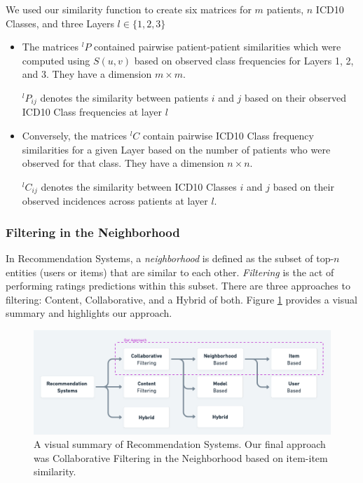 \documentclass[twoside,11pt]{article}
\begin{document}
We used our similarity function to create six matrices for $m$ patients, $n$ ICD10 Classes, and three Layers $l \in \{1,2,3\}$
\begin{itemize}
  \item The matrices ${}^{l}P$ contained pairwise patient-patient similarities which were computed using $S(u, v)$ based on observed class frequencies for Layers 1, 2, and 3. They have a dimension $m \times m$.

  ${}^{l}P_{ij}$ denotes the similarity between patients $i$ and $j$ based on their observed ICD10 Class frequencies at layer $l$

  \item Conversely, the matrices ${}^{l}C$ contain pairwise ICD10 Class frequency similarities for a given Layer based on the number of patients who were observed for that class. They have a dimension $n \times n$.

  ${}^{l}C_{ij}$ denotes the similarity between ICD10 Classes $i$ and $j$ based on their observed incidences across patients at layer $l$.

\end{itemize}


\newpage

\subsubsection{Filtering in the Neighborhood} \label{section:filtering-in-n}

In Recommendation Systems, a \textit{neighborhood} is defined as the subset of top-$n$ entities (users or items) that are similar to each other. \textit{Filtering} is the act of performing ratings predictions within this subset. There are three approaches to filtering: Content, Collaborative, and a Hybrid of both. Figure \ref{fig:recommender-systems} provides a visual summary and highlights our approach.

\begin{figure}[H]
  \includegraphics[width=\textwidth]{./images/recommender-systems.png}
  \caption{A visual summary of Recommendation Systems. Our final approach was Collaborative Filtering in the Neighborhood based on item-item similarity.}
  \label{fig:recommender-systems}
\end{figure}
\end{document}
